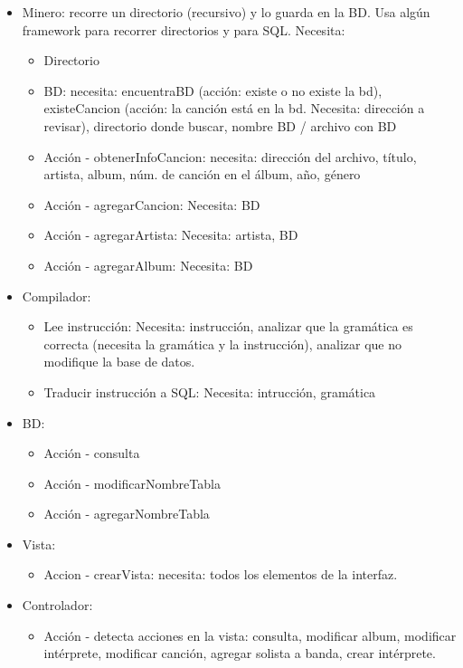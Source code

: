\documentclass{article}
\begin{document}
\begin{itemize}
  \item Minero: recorre un directorio (recursivo) y lo guarda en la BD. Usa algún framework para recorrer directorios y para SQL. Necesita:
  \begin{itemize}
    \item Directorio
    \item BD: necesita: encuentraBD (acción: existe o no existe la bd), existeCancion (acción: la canción está en la bd. Necesita: dirección a revisar), directorio donde buscar, nombre BD / archivo con BD
    \item Acción - obtenerInfoCancion: necesita: dirección del archivo, título, artista, album, núm. de canción en el álbum, año, género
    \item Acción - agregarCancion: Necesita: BD
    \item Acción - agregarArtista: Necesita: artista, BD
    \item Acción - agregarAlbum: Necesita: BD
  \end{itemize}

  \item Compilador:
  \begin{itemize}
    \item Lee instrucción: Necesita: instrucción, analizar que la gramática es correcta (necesita la gramática y la instrucción), analizar que no modifique la base de datos.
    \item Traducir instrucción a SQL: Necesita: intrucción, gramática
  \end{itemize}

  \item BD:
  \begin{itemize}
    \item Acción - consulta
    \item Acción - modificarNombreTabla
    \item Acción - agregarNombreTabla
  \end{itemize}

  \item Vista:
  \begin{itemize}
    \item Accion - crearVista: necesita: todos los elementos de la interfaz. 
  \end{itemize}

  \item Controlador:
  \begin{itemize}
    \item Acción - detecta acciones en la vista: consulta, modificar album, modificar intérprete, modificar canción, agregar solista a banda, crear intérprete. 
  \end{itemize}
\end{itemize}
\end{document}
